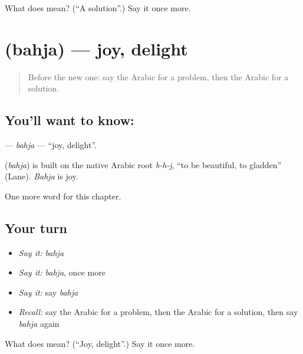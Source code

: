 \begin{tcolorbox}[breakable,colback=teal!4,colframe=teal!35!black,title={Before you move on}]
What does  mean? (\textquotedblleft{}A solution\textquotedblright{}.) Say it once more.
\end{tcolorbox}
\section[\texorpdfstring{\ar{بهجة} (bahja)}{بهجة (bahja)}]{ (bahja) — joy, delight}

\label{lesson:AR-C206-bahja}



\begin{quote}
Before the new one: say the Arabic for a problem, then the Arabic for a solution.
\end{quote}

\subsection*{You'll want to know: }
\textbf{} — \emph{bahja} — \textquotedblleft{}joy, delight\textquotedblright{}.

\begin{cousinweb}
\textbf{} (\emph{bahja}) is built on the native Arabic root \emph{b-h-j}, \textquotedblleft{}to be beautiful, to gladden\textquotedblright{} (Lane). \emph{Bahja} is joy.
\end{cousinweb}

\begin{grammarlens}[title={What you've built}]
One more word for this chapter.
\end{grammarlens}

\subsection*{Your turn}
\begin{itemize}
\raggedright
  \item \emph{Say it:} \emph{bahja}
  \item \emph{Say it:} \emph{bahja}, once more
  \item \emph{Say it:} say \emph{bahja}
  \item \emph{Recall:} say the Arabic for a problem, then the Arabic for a solution, then say \emph{bahja} again
\end{itemize}

\begin{tcolorbox}[breakable,colback=teal!4,colframe=teal!35!black,title={Before you move on}]
What does  mean? (\textquotedblleft{}Joy, delight\textquotedblright{}.) Say it once more.
\end{tcolorbox}
